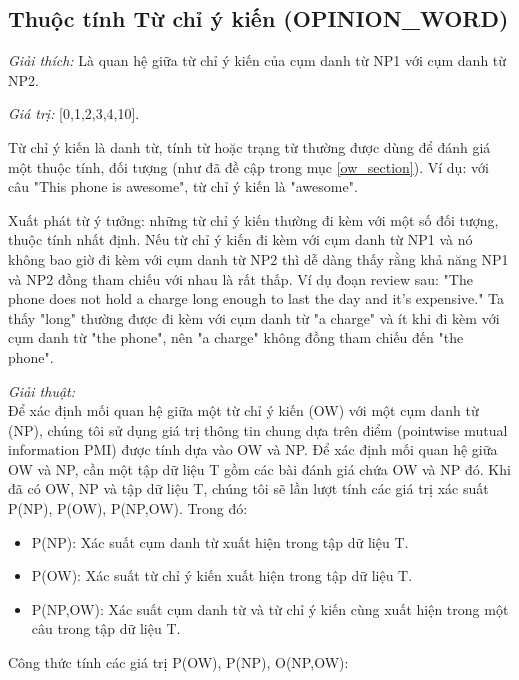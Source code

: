 \documentclass[12pt]{report}
\begin{document}
			\subsection*{Thuộc tính Từ chỉ ý kiến (OPINION\_WORD)}
				\par \textit{Giải thích:} Là quan hệ giữa từ chỉ ý kiến của cụm danh từ NP1 với cụm danh từ NP2.
				\par \textit{Giá trị:} [0,1,2,3,4,10]. 
				\par Từ chỉ ý kiến là danh từ, tính từ hoặc trạng từ thường được dùng để đánh giá một thuộc tính, đối tượng (như đã đề cập trong mục \ref{ow_section}). Ví dụ: với câu "This phone is awesome", từ chỉ ý kiến là "awesome".
				\par Xuất phát từ ý tưởng: những từ chỉ ý kiến thường đi kèm với một số đối tượng, thuộc tính nhất định. Nếu từ chỉ ý kiến đi kèm với cụm danh từ NP1 và nó không bao giờ đi kèm với cụm danh từ NP2 thì dễ dàng thấy rằng khả năng NP1 và NP2 đồng tham chiếu với nhau là rất thấp. Ví dụ đoạn review sau: "The phone does not hold a charge long enough to last the day and it’s expensive." Ta thấy "long" thường được đi kèm với cụm danh từ "a charge" và ít khi đi kèm với cụm danh từ "the phone", nên "a charge" không đồng tham chiếu đến "the phone".
				\par \textit{Giải thuật:}
				\\Để xác định mối quan hệ giữa một từ chỉ ý kiến (OW) với một cụm danh từ (NP), chúng tôi sử dụng giá trị thông tin chung dựa trên điểm (pointwise mutual information PMI) được tính dựa vào OW và NP. Để xác định mối quan hệ giữa OW và NP, cần một tập dữ liệu T gồm các bài đánh giá chứa OW và NP đó. Khi đã có OW, NP và tập dữ liệu T, chúng tôi sẽ lần lượt tính các giá trị xác suất P(NP), P(OW), P(NP,OW). Trong đó:
				\begin{itemize} 
					\item{P(NP): Xác suất cụm danh từ xuất hiện trong tập dữ liệu T.}
					\item{P(OW): Xác suất từ chỉ ý kiến xuất hiện trong tập dữ liệu T.}
					\item{P(NP,OW): Xác suất cụm danh từ và từ chỉ ý kiến cùng xuất hiện trong một câu trong tập dữ liệu T.}
				\end{itemize}
				\par Công thức tính các giá trị P(OW), P(NP), O(NP,OW):
\end{document}
